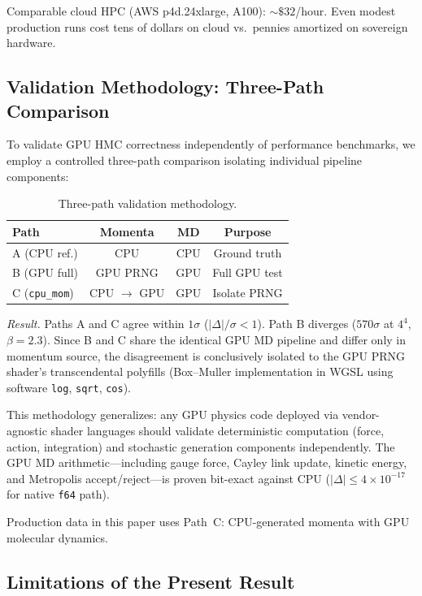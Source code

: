 \documentclass[aps,prl,twocolumn,superscriptaddress,showpacs]{revtex4-2}
\begin{document}
Comparable cloud HPC (AWS p4d.24xlarge, A100): ${\sim}\$32$/hour.
Even modest production runs cost tens of dollars on cloud vs.\ pennies
amortized on sovereign hardware.

\subsection{Validation Methodology: Three-Path Comparison}
\label{sec:validation}

To validate GPU HMC correctness independently of performance benchmarks,
we employ a controlled three-path comparison isolating individual
pipeline components:

\begin{table}[h]
\caption{Three-path validation methodology.}
\label{tab:threepath}
\begin{ruledtabular}
\begin{tabular}{lccc}
Path & Momenta & MD & Purpose \\
\midrule
A (CPU ref.) & CPU & CPU & Ground truth \\
B (GPU full) & GPU PRNG & GPU & Full GPU test \\
C (\texttt{cpu\_mom}) & CPU $\to$ GPU & GPU & Isolate PRNG \\
\end{tabular}
\end{ruledtabular}
\end{table}

\textit{Result.} Paths A and C agree within $1\sigma$
($|\Delta|/\sigma < 1$). Path B diverges ($570\sigma$ at $4^4$,
$\beta = 2.3$). Since B and C share the identical GPU MD pipeline and
differ only in momentum source, the disagreement is conclusively isolated
to the GPU PRNG shader's transcendental polyfills (Box--Muller
implementation in WGSL using software \texttt{log}, \texttt{sqrt},
\texttt{cos}).

This methodology generalizes: any GPU physics code deployed via
vendor-agnostic shader languages should validate deterministic
computation (force, action, integration) and stochastic generation
components independently. The GPU MD arithmetic---including gauge force,
Cayley link update, kinetic energy, and Metropolis accept/reject---is
proven bit-exact against CPU ($|\Delta| \leq 4 \times 10^{-17}$ for
native \texttt{f64} path).

Production data in this paper uses Path~C: CPU-generated momenta with
GPU molecular dynamics.

\subsection{Limitations of the Present Result}
\end{document}
